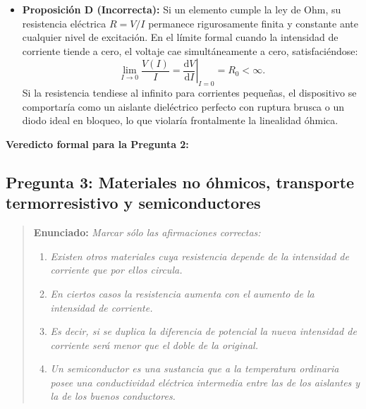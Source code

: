 \begin{appendices}
\begin{itemize}
    \item \textbf{Proposición D (Incorrecta):} Si un elemento cumple la ley de Ohm, su resistencia eléctrica $R = V/I$ permanece rigurosamente finita y constante ante cualquier nivel de excitación. En el límite formal cuando la intensidad de corriente tiende a cero, el voltaje cae simultáneamente a cero, satisfaciéndose:
    \begin{equation}
        \lim_{I \to 0} \frac{V(I)}{I} = \left. \frac{\mathrm{d}V}{\mathrm{d}I} \right|_{I=0} = R_0 < \infty.
    \end{equation}
    Si la resistencia tendiese al infinito para corrientes pequeñas, el dispositivo se comportaría como un aislante dieléctrico perfecto con ruptura brusca o un diodo ideal en bloqueo, lo que violaría frontalmente la linealidad óhmica.
\end{itemize}

\textbf{Veredicto formal para la Pregunta 2:}  
\begin{center}
\end{center}

\subsection{Pregunta 3: Materiales no óhmicos, transporte termorresistivo y semiconductores}

\begin{quote}
    \textbf{Enunciado:} \textit{Marcar sólo las afirmaciones correctas:}
    \begin{enumerate}
        \renewcommand{\theenumi}{\Alph{enumi}}
        \renewcommand{\labelenumi}{\textbf{\theenumi.}}
        \item \textit{Existen otros materiales cuya resistencia depende de la intensidad de corriente que por ellos circula.}
        \item \textit{En ciertos casos la resistencia aumenta con el aumento de la intensidad de corriente.}
        \item \textit{Es decir, si se duplica la diferencia de potencial la nueva intensidad de corriente será menor que el doble de la original.}
        \item \textit{Un semiconductor es una sustancia que a la temperatura ordinaria posee una conductividad eléctrica intermedia entre las de los aislantes y la de los buenos conductores.}
    \end{enumerate}
\end{quote}


\end{appendices}
